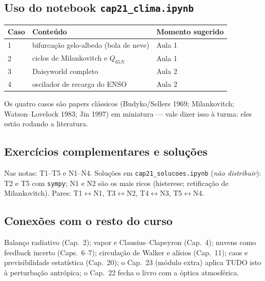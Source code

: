 \subsection*{Uso do notebook \texttt{cap21\_clima.ipynb}}

\begin{center}
\begin{tabular}{lll}
\hline
Caso & Conteúdo & Momento sugerido \\
\hline
1 & bifurcação gelo-albedo (bola de neve) & Aula 1 \\
2 & ciclos de Milankovitch e $Q_{65N}$ & Aula 1 \\
3 & Daisyworld completo & Aula 2 \\
4 & oscilador de recarga do ENSO & Aula 2 \\
\hline
\end{tabular}
\end{center}

Os quatro casos são papers clássicos (Budyko/Sellers 1969; Milankovitch;
Watson--Lovelock 1983; Jin 1997) em miniatura — vale dizer isso à
turma: eles estão rodando a literatura.

\subsection*{Exercícios complementares e soluções}

Nas notas: T1--T5 e N1--N4. Soluções em \texttt{cap21\_solucoes.ipynb}
(\emph{não distribuir}): T2 e T5 com \texttt{sympy}; N1 e N2 são os
mais ricos (histerese; retificação de Milankovitch). Pares:
T1$\leftrightarrow$N1, T3$\leftrightarrow$N2, T4$\leftrightarrow$N3,
T5$\leftrightarrow$N4.

\subsection*{Conexões com o resto do curso}

Balanço radiativo (Cap.~2); vapor e Clausius--Clapeyron (Cap.~4);
nuvens como feedback incerto (Caps.~6--7); circulação de Walker e
alísios (Cap.~11); caos e previsibilidade estatística (Cap.~20); o
Cap.~23 (módulo extra) aplica TUDO isto à perturbação antrópica; o Cap.~22 fecha o livro com a óptica atmosférica.
